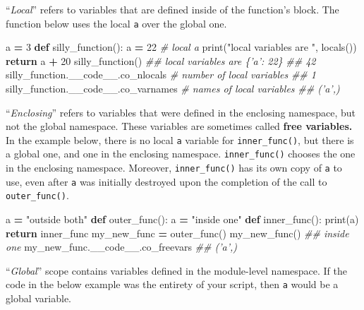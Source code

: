 \documentclass[12pt,krantz2]{krantz}
\makeatletter
\newenvironment{Shaded}{\begin{snugshade}}{\end{snugshade}}
\newcommand{\BuiltInTok}[1]{#1}
\newcommand{\CommentTok}[1]{\textcolor[rgb]{0.37,0.37,0.37}{\textit{#1}}}
\newcommand{\ControlFlowTok}[1]{\textcolor[rgb]{0.27,0.27,0.27}{\textbf{#1}}}
\newcommand{\DecValTok}[1]{\textcolor[rgb]{0.06,0.06,0.06}{#1}}
\newcommand{\KeywordTok}[1]{\textcolor[rgb]{0.27,0.27,0.27}{\textbf{#1}}}
\newcommand{\NormalTok}[1]{#1}
\newcommand{\OperatorTok}[1]{\textcolor[rgb]{0.43,0.43,0.43}{\textbf{#1}}}
\newcommand{\StringTok}[1]{\textcolor[rgb]{0.5,0.5,0.5}{#1}}
\newenvironment{kframe}{%
\medskip{}
\setlength{\fboxsep}{.8em}
 \def\at@end@of@kframe{}%
 \ifinner\ifhmode%
  \def\at@end@of@kframe{\end{minipage}}%
  \begin{minipage}{\columnwidth}%
 \fi\fi%
 \def\FrameCommand##1{\hskip\@totalleftmargin \hskip-\fboxsep
 \colorbox{shadecolor}{##1}\hskip-\fboxsep
     \hskip-\linewidth \hskip-\@totalleftmargin \hskip\columnwidth}%
 \MakeFramed {\advance\hsize-\width
   \@totalleftmargin\z@ \linewidth\hsize
   \@setminipage}}%
 {\par\unskip\endMakeFramed%
 \at@end@of@kframe}
\renewenvironment{Shaded}{\begin{kframe}}{\end{kframe}}
\makeatother
\begin{document}
``\emph{Local}'' refers to variables that are defined inside of the function's block. The function below uses the local \texttt{a} over the global one.

\begin{Shaded}
\begin{Highlighting}[]
\NormalTok{a }\OperatorTok{=} \DecValTok{3}
\KeywordTok{def}\NormalTok{ silly_function():}
\NormalTok{    a }\OperatorTok{=} \DecValTok{22} \CommentTok{# local a}
    \BuiltInTok{print}\NormalTok{(}\StringTok{"local variables are "}\NormalTok{, }\BuiltInTok{locals}\NormalTok{())}
    \ControlFlowTok{return}\NormalTok{ a }\OperatorTok{+} \DecValTok{20}
\NormalTok{silly_function()}
\CommentTok{## local variables are  \{'a': 22\}}
\CommentTok{## 42}
\NormalTok{silly_function.__code__.co_nlocals }\CommentTok{# number of local variables}
\CommentTok{## 1}
\NormalTok{silly_function.__code__.co_varnames }\CommentTok{# names of local variables}
\CommentTok{## ('a',)}
\end{Highlighting}
\end{Shaded}

``\emph{Enclosing}'' refers to variables that were defined in the enclosing namespace, but not the global namespace. These variables are sometimes called \textbf{free variables.} In the example below, there is no local \texttt{a} variable for \texttt{inner\_func()}, but there is a global one, and one in the enclosing namespace. \texttt{inner\_func()} chooses the one in the enclosing namespace. Moreover, \texttt{inner\_func()} has its own copy of \texttt{a} to use, even after \texttt{a} was initially destroyed upon the completion of the call to \texttt{outer\_func()}.

\begin{Shaded}
\begin{Highlighting}[]
\NormalTok{a }\OperatorTok{=} \StringTok{"outside both"}
\KeywordTok{def}\NormalTok{ outer_func():}
\NormalTok{    a }\OperatorTok{=} \StringTok{"inside one"}
    \KeywordTok{def}\NormalTok{ inner_func():}
        \BuiltInTok{print}\NormalTok{(a)}
    \ControlFlowTok{return}\NormalTok{ inner_func}
\NormalTok{my_new_func }\OperatorTok{=}\NormalTok{ outer_func()}
\NormalTok{my_new_func()}
\CommentTok{## inside one}
\NormalTok{my_new_func.__code__.co_freevars}
\CommentTok{## ('a',)}
\end{Highlighting}
\end{Shaded}

``\emph{Global}'' scope contains variables defined in the module-level namespace. If the code in the below example was the entirety of your script, then \texttt{a} would be a global variable.
\end{document}
